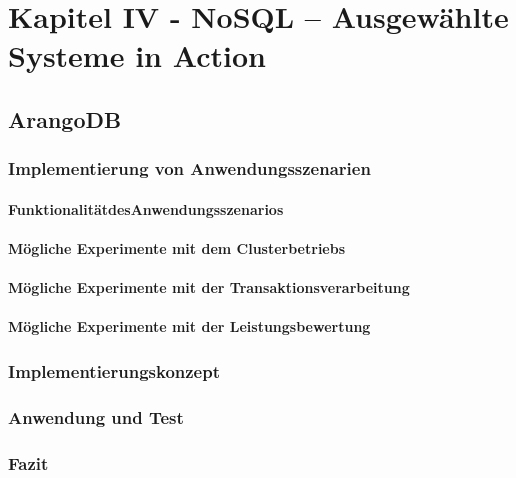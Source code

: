 \chapter{Kapitel IV - NoSQL – Ausgewählte Systeme in Action}
\section{ArangoDB}

\subsection{Implementierung von Anwendungsszenarien}
\subsubsection{FunktionalitätdesAnwendungsszenarios}
\subsubsection{Mögliche Experimente mit dem Clusterbetriebs}
\subsubsection{Mögliche Experimente mit der Transaktionsverarbeitung}
\subsubsection{Mögliche Experimente mit der Leistungsbewertung}

\subsection{Implementierungskonzept}

\subsection{Anwendung und Test}

\subsection{Fazit}